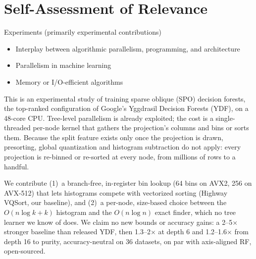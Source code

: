 \documentclass[sigconf,anonymous,review]{acmart}
\begin{document}


\section*{Self-Assessment of Relevance}

Experiments (primarily experimental contributions)

\begin{itemize}
\item Interplay between algorithmic parallelism, programming, and architecture
\item Parallelism in machine learning
\item Memory or I/O-efficient algorithms
\end{itemize}



This is an experimental study of training sparse oblique (SPO) decision forests, the top-ranked configuration of Google's Yggdrasil Decision Forests (YDF), on a 48-core CPU. Tree-level parallelism is already exploited; the cost is a single-threaded per-node kernel that gathers the projection's columns and bins or sorts them. Because the split feature exists only once the projection is drawn, presorting, global quantization and histogram subtraction do not apply: every projection is re-binned or re-sorted at every node, from millions of rows to a handful.

We contribute (1)~a branch-free, in-register bin lookup (64 bins on AVX2, 256 on AVX-512) that lets histograms compete with vectorized sorting (Highway VQSort, our baseline), and (2)~a per-node, size-based choice between the $O(n\log k+k)$ histogram and the $O(n\log n)$ exact finder, which no tree learner we know of does. We claim no new bounds or accuracy gains: a 2--5$\times$ stronger baseline than released YDF, then 1.3--2$\times$ at depth 6 and 1.2--1.6$\times$ from depth 16 to purity, accuracy-neutral on 36 datasets, on par with axis-aligned RF, open-sourced.
\end{document}
